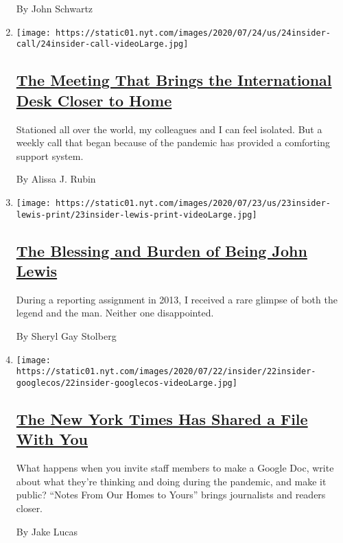 \begin{enumerate}
  By John Schwartz
\item
  \texttt{[image: https://static01.nyt.com/images/2020/07/24/us/24insider-call/24insider-call-videoLarge.jpg]}

  \hypertarget{the-meeting-that-brings-the-international-desk-closer-to-home}{%
  \subsection{\texorpdfstring{\href{/2020/07/24/insider/international-journalists-meeting.html}{The
  Meeting That Brings the International Desk Closer to
  Home}}{The Meeting That Brings the International Desk Closer to Home}}\label{the-meeting-that-brings-the-international-desk-closer-to-home}}

  Stationed all over the world, my colleagues and I can feel isolated.
  But a weekly call that began because of the pandemic has provided a
  comforting support system.

  By Alissa J. Rubin
\item
  \texttt{[image: https://static01.nyt.com/images/2020/07/23/us/23insider-lewis-print/23insider-lewis-print-videoLarge.jpg]}

  \hypertarget{the-blessing-and-burden-of-being-john-lewis}{%
  \subsection{\texorpdfstring{\href{/2020/07/23/insider/john-lewis-memory.html}{The
  Blessing and Burden of Being John
  Lewis}}{The Blessing and Burden of Being John Lewis}}\label{the-blessing-and-burden-of-being-john-lewis}}

  During a reporting assignment in 2013, I received a rare glimpse of
  both the legend and the man. Neither one disappointed.

  By Sheryl Gay Stolberg
\item
  \texttt{[image: https://static01.nyt.com/images/2020/07/22/insider/22insider-googlecos/22insider-googlecos-videoLarge.jpg]}

  \hypertarget{the-new-york-times-has-shared-a-file-with-you}{%
  \subsection{\texorpdfstring{\href{/2020/07/21/insider/new-york-times-google-docs.html}{The
  New York Times Has Shared a File With
  You}}{The New York Times Has Shared a File With You}}\label{the-new-york-times-has-shared-a-file-with-you}}

  What happens when you invite staff members to make a Google Doc, write
  about what they're thinking and doing during the pandemic, and make it
  public? ``Notes From Our Homes to Yours'' brings journalists and
  readers closer.

  By Jake Lucas
\end{enumerate}

